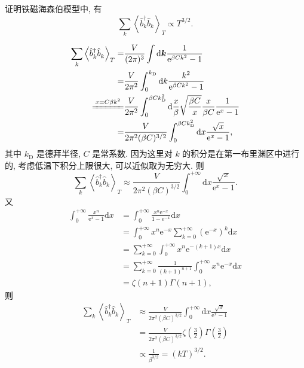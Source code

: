 \begin{question2}{}{}
证明铁磁海森伯模型中, 有 
\begin{equation}
    \sum_{k}\left\langle\hat{b}_{k}^{\dagger} \hat{b}^{}_{k}\right\rangle_{T}\propto T^{3 / 2}.
    \end{equation}
\end{question2}
\begin{solution}
\begin{align}
\sum_{k}\left\langle\hat{b}_{k}^{\dagger} \hat{b}^{}_{k}\right\rangle_{T} =&\frac{V}{(2 \pi)^{3}} \int \mathrm{d}\boldsymbol{k} \frac{1}{\mathrm{e}^{\beta C k^{2}}-1} \nonumber\\
=&\frac{V}{2 \pi^{2}} \int_{0}^{k_\mathrm{D}} \mathrm{d} k \frac{k^{2}}{\mathrm{e}^{\beta C k^{2}}-1}\nonumber \\
\xlongequal[]{x=C\beta k^{2}} &\frac{V}{2 \pi^{2}} \int_{0}^{\beta C k_\mathrm{D}^{2}} \mathrm{d} \frac{x}{\beta} \sqrt{\frac{\beta C}{x}} \frac{x}{\beta C} \frac{1}{\mathrm{e}^{x}-1}\nonumber \\
=&\frac{V}{2 \pi^{2}(\beta C)^{3 / 2}} \int_{0}^{\beta C k_\mathrm{D}^{2}} \mathrm{d} x \frac{\sqrt{x}}{\mathrm{e}^{x}-1},
\end{align}
其中 $k_\mathrm{D}$ 是德拜半径, $C$ 是常系数. 因为这里对 $k$ 的积分是在第一布里渊区中进行的, 考虑低温下积分上限很大, 可以近似取为无穷大. 则
\begin{equation}
\sum_{k}\left\langle\hat{b}_{k}^{\dagger} \hat{b}^{}_{k}\right\rangle_{T} \approx\frac{V}{2 \pi^{2}(\beta C)^{3 / 2}} \int_{0}^{+\infty} \mathrm{d} x \frac{\sqrt{x}}{\mathrm{e}^{x}-1} .
\end{equation}
又
\begin{align}
\int_{0}^{+\infty} \frac{x^{n}}{\mathrm{e}^{x}-1} \mathrm{d} x &=\int_{0}^{+\infty} \frac{x^{n} \mathrm{e}^{-x}}{1-\mathrm{e}^{-x}} \mathrm{d} x \nonumber\\
&=\int_{0}^{+\infty} x^{n} \mathrm{e}^{-x} \sum_{k=0}^{+\infty}\left(\mathrm{e}^{-x}\right)^{k} \mathrm{d} x \nonumber\\
&=\sum_{k=0}^{+\infty} \int_{0}^{+\infty} x^{n} \mathrm{e}^{-(k+1) x} \mathrm{d} x \nonumber\\
&=\sum_{k=0}^{+\infty} \frac{1}{(k+1)^{n+1}} \int_{0}^{+\infty} x^{n} \mathrm{e}^{-x} \mathrm{d} x \nonumber\\
&=\zeta(n+1) \Gamma(n+1),
\end{align}
则
\begin{align}
\sum_{k}\left\langle\hat{b}_{k}^{\dagger} \hat{b}^{}_{k}\right\rangle_{T} &\approx\frac{V}{2 \pi^{2}(\beta C)^{3 / 2}} \int_{0}^{+\infty} \mathrm{d} x \frac{\sqrt{x}}{\mathrm{e}^{x}-1}\nonumber\\
&=\frac{V}{2 \pi^{2}(\beta C)^{3 / 2}}\zeta\left(\frac{3}{2}\right) \Gamma\left(\frac{3}{2}\right)\nonumber\\
&\propto \frac{1}{\beta^{3 / 2}}=(k T)^{3 / 2} .
\end{align}
\end{solution}

